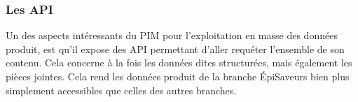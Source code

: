                 \subsubsection{Les API}

                Un des aspects intéressants du PIM pour l'exploitation en masse des données produit, est qu'il expose des API permettant d'aller requéter l'ensemble de son contenu.
                Cela concerne à la fois les données dites structurées, mais également les pièces jointes.
                Cela rend les données produit de la branche \'{E}piSaveurs bien plus simplement accessibles que celles des autres branches.